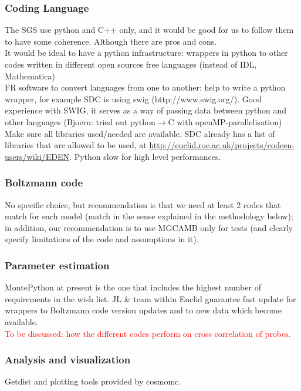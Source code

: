 \subsubsection{Coding Language}
The SGS use python and C++ only, and it would be good for us to follow them to have some coherence. Although there are pros and cons.\\
It would be ideal to have a python infrastructure: wrappers in python to other codes written in different open sources free languages (instead of IDL, Mathematica)\\
FR software to convert languages from one to another: help to write a python wrapper, for example SDC is using swig (http://www.swig.org/).
Good experience with SWIG, it serves as a way of passing data between python and other languages (Bjoern: tried out python$\rightarrow$C with openMP-parallelisation)\\
Make sure all libraries used/needed are available. 
SDC already has a list of libraries that are allowed to be used, at \url{http://euclid.roe.ac.uk/projects/codeen-users/wiki/EDEN}.
Python slow for high level performances. 

\subsubsection{Boltzmann code}

No specific choice, but recommendation is that we need at least 2 codes that match for each model (match in the sense explained in the methodology below); 
in addition, our recommendation is to use MGCAMB only for tests (and clearly specify limitations of the code and assumptions in it).


\subsubsection{Parameter estimation}
MontePython at present is the one that includes the highest number of requirements in the wish list. JL \& team within Euclid guarantee fast 
update for wrappers to Boltzmann code version updates and to new data which become available. \\
\textcolor{red}{To be discussed: how the different codes perform on cross correlation of probes.}

\subsubsection{Analysis and visualization}
Getdist and plotting tools provided by cosmomc.

